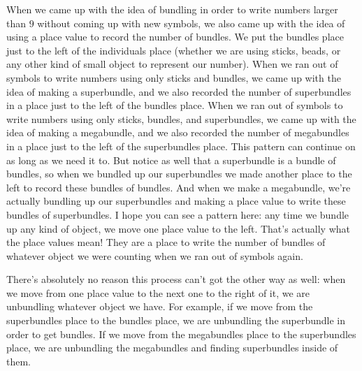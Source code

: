 \documentclass{ximera}
\begin{document}
When we came up with the idea of bundling in order to write numbers larger than $9$ without coming up with new symbols, we also came up with the idea of using a place value to record the number of bundles. We put the bundles place just to the left of the individuals place (whether we are using sticks, beads, or any other kind of small object to represent our number). When we ran out of symbols to write numbers using only sticks and bundles, we came up with the idea of making a superbundle, and we also recorded the number of superbundles in a place just to the left of the bundles place. When we ran out of symbols to write numbers using only sticks, bundles, and superbundles, we came up with the idea of making a megabundle, and we also recorded the number of megabundles in a place just to the left of the superbundles place. This pattern can continue on as long as we need it to. But notice as well that a superbundle is a bundle of bundles, so when we bundled up our superbundles we made another place to the left to record these bundles of bundles. And when we make a megabundle, we're actually bundling up our superbundles and making a place value to write these bundles of superbundles. I hope you can see a pattern here: any time we bundle up any kind of object, we move one place value to the left. That's actually what the place values mean! They are a place to write the number of bundles of whatever object we were counting when we ran out of symbols again.

\begin{image}
\end{image}

There's absolutely no reason this process can't got the other way as well: when we move from one place value to the next one to the right of it, we are unbundling whatever object we have. For example, if we move from the superbundles place to the bundles place, we are unbundling the superbundle in order to get bundles. If we move from the megabundles place to the superbundles place, we are unbundling the megabundles and finding superbundles inside of them. 
\end{document}
